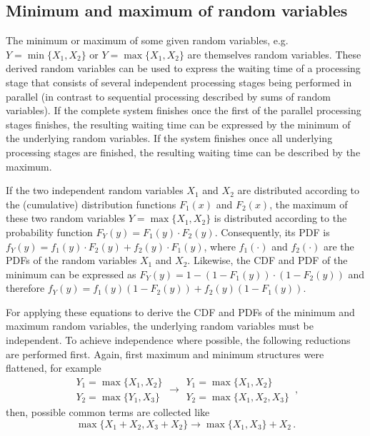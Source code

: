 \subsection{Minimum and maximum of random variables}
The minimum or maximum of some given random variables, e.g. $Y=\min\{X_1,X_2\}$ or 
$Y=\max\{X_1,X_2\}$ are themselves random variables. These derived random variables can be used to
express the waiting time of a processing stage that consists of several independent processing stages being
performed in parallel (in contrast to sequential processing described by sums of random variables). 
If the complete system finishes once the first of the parallel processing stages finishes, the 
resulting waiting time can be expressed by the minimum of the underlying random variables. If the system
finishes once all underlying processing stages are finished, the resulting waiting time can be described
by the maximum.	 

If the two independent random variables $X_1$ and $X_2$ are distributed according to the (cumulative) distribution
functions $F_1(x)$ and $F_2(x)$, the maximum of these two random variables $Y=\max\{X_1,X_2\}$
is distributed according to the probability function $F_Y(y)=F_1(y)\cdot F_2(y)$. Consequently, its PDF
is $f_Y(y)=f_1(y)\cdot F_2(y) + f_2(y)\cdot F_1(y)$, where $f_1(\cdot)$ and $f_2(\cdot)$ are the PDFs
of the random variables $X_1$ and $X_2$. Likewise, the CDF and PDF of the minimum can be expressed as
$F_Y(y)=1-(1-F_1(y))\cdot(1-F_2(y))$ and therefore $f_Y(y) = f_1(y)(1-F_2(y)) + f_2(y)(1-F_1(y))$.

For applying these equations to derive the CDF and PDFs of the minimum and maximum random variables, the 
underlying random variables must be independent. To achieve independence where possible, the following 
reductions are performed first. Again, first maximum and minimum structures were flattened, for example
\begin{equation}
 \begin{array}{l}
  Y_1 = \max\{X_1,X_2\}\\
  Y_2 = \max\{Y_1,X_3\}
 \end{array} \longrightarrow
 \begin{array}{l}
  Y_1 = \max\{X_1,X_2\}\\
  Y_2 = \max\{X_1,X_2,X_3\}
 \end{array}\,, \nonumber
\end{equation}
then, possible common terms are collected like
\begin{equation}
 \max\{X_1 + X_2, X_3 + X_2\} \longrightarrow \max\{X_1,X_3\}+X_2\,. \nonumber
\end{equation}

